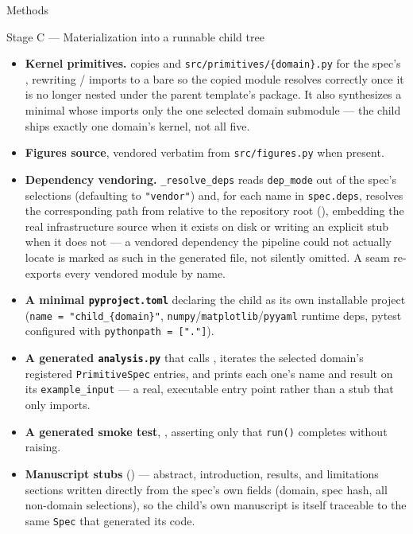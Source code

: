\documentclass[
  ignorenonframetext,
]{beamer}
\providecommand{\tightlist}{%
  \setlength{\itemsep}{0pt}\setlength{\parskip}{0pt}}
\begin{document}
\begin{frame}{Methods}
\begin{block}{Stage C --- Materialization into a runnable child tree}
\begin{itemize}
\tightlist
\item
  \textbf{Kernel primitives.}  copies
   and
  \texttt{src/primitives/\{domain\}.py} for the spec's
  , rewriting  /
   imports to a bare 
  so the copied module resolves correctly once it is no longer nested
  under the parent template's package. It also synthesizes a minimal
   whose
   imports only the one selected domain
  submodule --- the child ships exactly one domain's kernel, not all
  five.
\item
  \textbf{Figures source}, vendored verbatim from
  \texttt{src/figures.py} when present.
\item
  \textbf{Dependency vendoring.} \texttt{\_resolve\_deps} reads
  \texttt{dep\_mode} out of the spec's selections (defaulting to
  \texttt{"vendor"}) and, for each name in \texttt{spec.deps}, resolves
  the corresponding path from 
  relative to the repository root
  (), embedding the real
  infrastructure source when it exists on disk or writing an explicit
   stub when it does not
  --- a vendored dependency the pipeline could not actually locate is
  marked as such in the generated file, not silently omitted. A seam
   re-exports every vendored module by
  name.
\item
  \textbf{A minimal \texttt{pyproject.toml}} declaring the child as its
  own installable project (\texttt{name\ =\ "child\_\{domain\}"},
  \texttt{numpy}/\texttt{matplotlib}/\texttt{pyyaml} runtime deps,
  pytest configured with \texttt{pythonpath\ =\ {[}"."{]}}).
\item
  \textbf{A generated \texttt{analysis.py}} that calls
  , iterates the selected domain's
  registered \texttt{PrimitiveSpec} entries, and prints each one's name
  and result on its \texttt{example\_input} --- a real, executable entry
  point rather than a stub that only imports.
\item
  \textbf{A generated smoke test}, ,
  asserting only that \texttt{run()} completes without raising.
\item
  \textbf{Manuscript stubs} () --- abstract,
  introduction, results, and limitations sections written directly from
  the spec's own fields (domain, spec hash, all non-domain selections),
  so the child's own manuscript is itself traceable to the same
  \texttt{Spec} that generated its code.
\end{itemize}


\end{block}
\end{frame}
\end{document}
